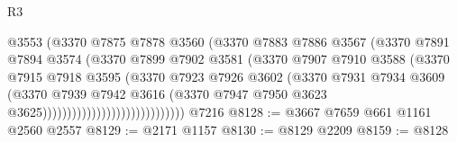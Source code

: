 \begin{lexlean}{R3}
\begin{coremodule}
                                          @3553
                                          (@3370
                                            @7875
                                            @7878
                                            @3560
                                            (@3370
                                              @7883
                                              @7886
                                              @3567
                                              (@3370
                                                @7891
                                                @7894
                                                @3574
                                                (@3370
                                                  @7899
                                                  @7902
                                                  @3581
                                                  (@3370
                                                    @7907
                                                    @7910
                                                    @3588
                                                    (@3370
                                                      @7915
                                                      @7918
                                                      @3595
                                                      (@3370
                                                        @7923
                                                        @7926
                                                        @3602
                                                        (@3370
                                                          @7931
                                                          @7934
                                                          @3609
                                                          (@3370
                                                            @7939
                                                            @7942
                                                            @3616
                                                            (@3370
                                                              @7947
                                                              @7950
                                                              @3623
                                                              @3625)))))))))))))))))))))))))))))
    @7216
@8128 := @3667 @7659 @661 @1161 @2560 @2557
@8129 := @2171 @1157
@8130 := @8129 @2209
@8159 := @8128

\end{coremodule}
\end{lexlean}
